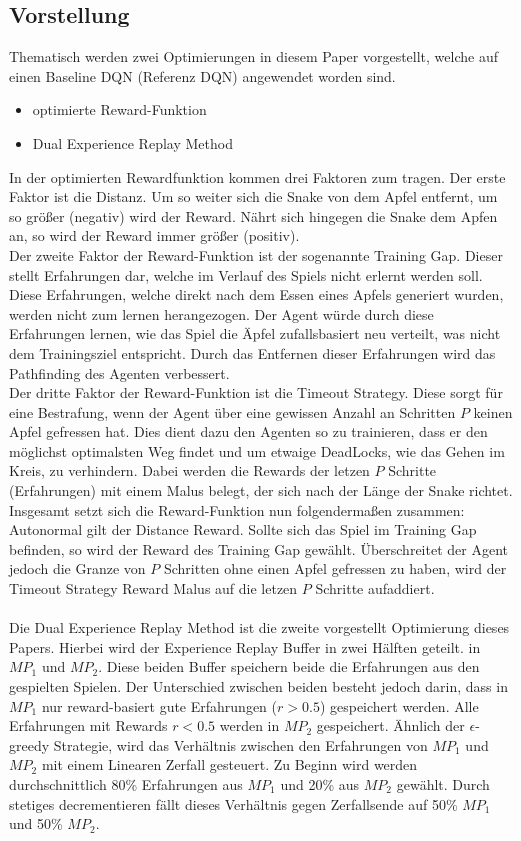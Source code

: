 \subsection{Vorstellung}
Thematisch werden zwei Optimierungen in diesem Paper vorgestellt, welche auf einen Baseline DQN (Referenz DQN) angewendet worden sind.
\begin{itemize}
	\item optimierte Reward-Funktion
	\item Dual Experience Replay Method 
\end{itemize} 
In der optimierten Rewardfunktion kommen drei Faktoren zum tragen. Der erste Faktor ist die Distanz. Um so weiter sich die Snake von dem Apfel entfernt, um so größer (negativ) wird der Reward. Nährt sich hingegen die Snake dem Apfen an, so wird der Reward immer größer (positiv).\\
Der zweite Faktor der Reward-Funktion ist der sogenannte Training Gap. Dieser stellt Erfahrungen dar, welche im Verlauf des Spiels nicht erlernt werden soll. Diese Erfahrungen, welche direkt nach dem Essen eines Apfels generiert wurden, werden nicht zum lernen herangezogen. Der Agent würde durch diese Erfahrungen lernen, wie das Spiel die Äpfel zufallsbasiert neu verteilt, was nicht dem Trainingsziel entspricht. Durch das Entfernen dieser Erfahrungen wird das Pathfinding des Agenten verbessert.\\
Der dritte Faktor der Reward-Funktion ist die Timeout Strategy. Diese sorgt für eine Bestrafung, wenn der Agent über eine gewissen Anzahl an Schritten $P$ keinen Apfel gefressen hat. Dies dient dazu den Agenten so zu trainieren, dass er den möglichst optimalsten Weg findet und um etwaige DeadLocks, wie das Gehen im Kreis, zu verhindern. Dabei werden die Rewards der letzen $P$ Schritte (Erfahrungen) mit einem Malus belegt, der sich nach der Länge der Snake richtet.
Insgesamt setzt sich die Reward-Funktion nun folgendermaßen zusammen:\\
Autonormal gilt der Distance Reward. Sollte sich das Spiel im Training Gap befinden, so wird der Reward des Training Gap gewählt. Überschreitet der Agent jedoch die Granze von $P$ Schritten ohne einen Apfel gefressen zu haben, wird der Timeout Strategy Reward Malus auf die letzen $P$ Schritte aufaddiert.\\
\\ Die Dual Experience Replay Method ist die zweite vorgestellt Optimierung dieses Papers. Hierbei wird der Experience Replay Buffer in zwei Hälften geteilt. in $MP_{1}$ und $MP_{2}$. Diese beiden Buffer speichern beide die Erfahrungen aus den gespielten Spielen. Der Unterschied zwischen beiden besteht jedoch darin, dass in $MP_{1}$ nur reward-basiert gute Erfahrungen ($r > 0.5$) gespeichert werden. Alle Erfahrungen mit Rewards $r < 0.5$ werden in $MP_{2}$ gespeichert. Ähnlich der $\epsilon$-greedy Strategie, wird das Verhältnis zwischen den Erfahrungen von $MP_{1}$ und $MP_{2}$ mit einem Linearen Zerfall gesteuert. Zu Beginn wird werden durchschnittlich 80\% Erfahrungen aus $MP_{1}$ und 20\% aus $MP_{2}$ gewählt. Durch stetiges decrementieren fällt dieses Verhältnis gegen Zerfallsende auf 50\% $MP_{1}$ und 50\% $MP_{2}$.\\
